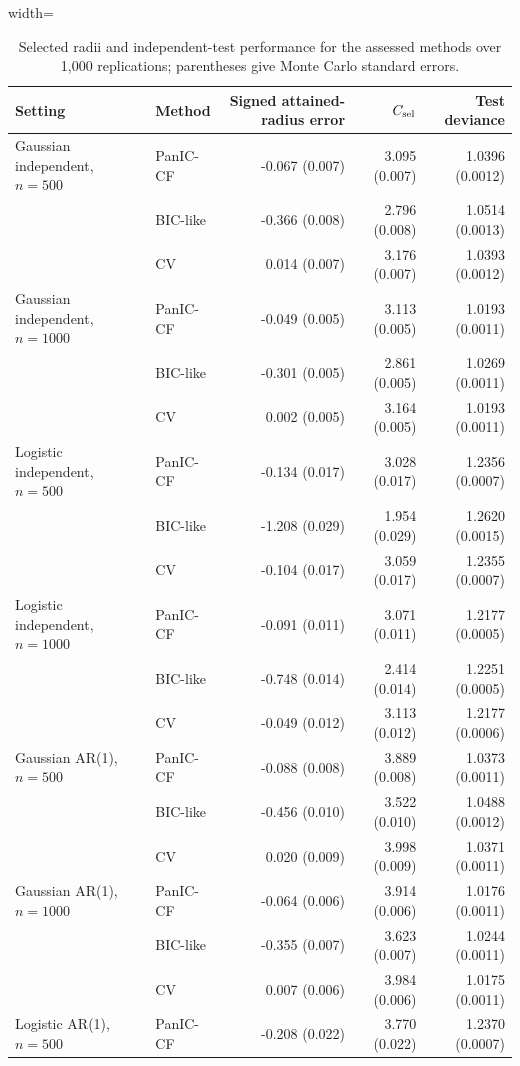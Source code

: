 \begin{table}[H]
\centering
\caption{Selected radii and independent-test performance for the assessed methods over 1,000 replications; parentheses give Monte Carlo standard errors.}
\label{Table: revised primary performance}
\begin{adjustbox}{width=\textwidth}
\scriptsize
\begin{tabular}{llrrr}
\hline
Setting & Method & Signed attained-radius error & $C_{\rm sel}$ & Test deviance \\
\hline
Gaussian independent, $n=500$ & PanIC-CF & -0.067 (0.007) & 3.095 (0.007) & 1.0396 (0.0012) \\
 & BIC-like & -0.366 (0.008) & 2.796 (0.008) & 1.0514 (0.0013) \\
 & CV & 0.014 (0.007) & 3.176 (0.007) & 1.0393 (0.0012) \\
Gaussian independent, $n=1000$ & PanIC-CF & -0.049 (0.005) & 3.113 (0.005) & 1.0193 (0.0011) \\
 & BIC-like & -0.301 (0.005) & 2.861 (0.005) & 1.0269 (0.0011) \\
 & CV & 0.002 (0.005) & 3.164 (0.005) & 1.0193 (0.0011) \\
Logistic independent, $n=500$ & PanIC-CF & -0.134 (0.017) & 3.028 (0.017) & 1.2356 (0.0007) \\
 & BIC-like & -1.208 (0.029) & 1.954 (0.029) & 1.2620 (0.0015) \\
 & CV & -0.104 (0.017) & 3.059 (0.017) & 1.2355 (0.0007) \\
Logistic independent, $n=1000$ & PanIC-CF & -0.091 (0.011) & 3.071 (0.011) & 1.2177 (0.0005) \\
 & BIC-like & -0.748 (0.014) & 2.414 (0.014) & 1.2251 (0.0005) \\
 & CV & -0.049 (0.012) & 3.113 (0.012) & 1.2177 (0.0006) \\
Gaussian AR(1), $n=500$ & PanIC-CF & -0.088 (0.008) & 3.889 (0.008) & 1.0373 (0.0011) \\
 & BIC-like & -0.456 (0.010) & 3.522 (0.010) & 1.0488 (0.0012) \\
 & CV & 0.020 (0.009) & 3.998 (0.009) & 1.0371 (0.0011) \\
Gaussian AR(1), $n=1000$ & PanIC-CF & -0.064 (0.006) & 3.914 (0.006) & 1.0176 (0.0011) \\
 & BIC-like & -0.355 (0.007) & 3.623 (0.007) & 1.0244 (0.0011) \\
 & CV & 0.007 (0.006) & 3.984 (0.006) & 1.0175 (0.0011) \\
Logistic AR(1), $n=500$ & PanIC-CF & -0.208 (0.022) & 3.770 (0.022) & 1.2370 (0.0007) \\

\end{tabular}
\end{adjustbox}
\end{table}
